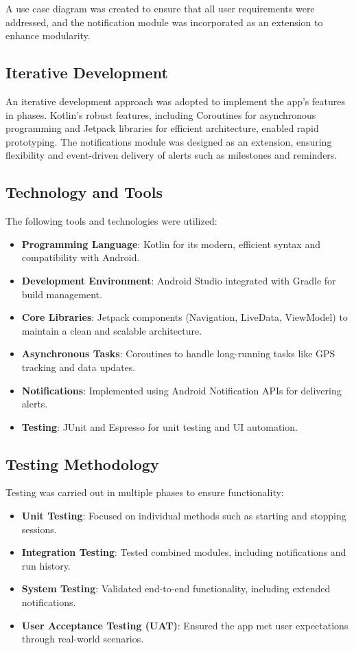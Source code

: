 A use case diagram was created to ensure that all user requirements were addressed, and the notification module was incorporated as an extension to enhance modularity.


\subsection{Iterative Development}
An iterative development approach was adopted to implement the app’s features in phases. Kotlin’s robust features, including Coroutines for asynchronous programming and Jetpack libraries for efficient architecture, enabled rapid prototyping. The notifications module was designed as an extension, ensuring flexibility and event-driven delivery of alerts such as milestones and reminders.

\subsection{Technology and Tools}
The following tools and technologies were utilized:
\begin{itemize}
    \item \textbf{Programming Language}: Kotlin for its modern, efficient syntax and compatibility with Android.
    \item \textbf{Development Environment}: Android Studio integrated with Gradle for build management.
    \item \textbf{Core Libraries}: Jetpack components (Navigation, LiveData, ViewModel) to maintain a clean and scalable architecture.
    \item \textbf{Asynchronous Tasks}: Coroutines to handle long-running tasks like GPS tracking and data updates.
    \item \textbf{Notifications}: Implemented using Android Notification APIs for delivering alerts.
    \item \textbf{Testing}: JUnit and Espresso for unit testing and UI automation.
\end{itemize}


\subsection{Testing Methodology}
Testing was carried out in multiple phases to ensure functionality:

\begin{itemize}
    \item \textbf{Unit Testing}: Focused on individual methods such as starting and stopping sessions.
    \item \textbf{Integration Testing}: Tested combined modules, including notifications and run history.
    \item \textbf{System Testing}: Validated end-to-end functionality, including extended notifications.
    \item \textbf{User Acceptance Testing (UAT)}: Ensured the app met user expectations through real-world scenarios.
\end{itemize}

